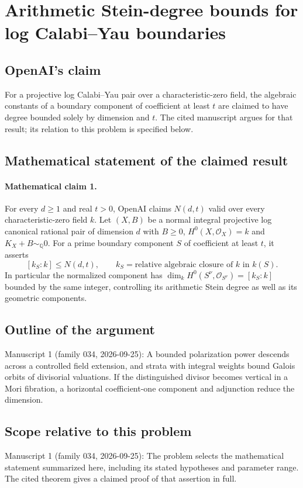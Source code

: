 \documentclass[11pt]{article}
\begin{document}
\section*{Arithmetic Stein-degree bounds for log Calabi–Yau boundaries}

\subsection{OpenAI's claim}
For a projective log Calabi--Yau pair over a characteristic-zero field, the algebraic constants of a boundary component of coefficient at least $t$ are claimed to have degree bounded solely by dimension and $t$. The cited manuscript argues for that result; its relation to this problem is specified below.

\subsection{Mathematical statement of the claimed result}
\paragraph{Mathematical claim 1.} For every $d\ge1$ and real $t>0$, OpenAI claims $N(d,t)$ valid over every characteristic-zero field $k$. Let $(X,B)$ be a normal integral projective log canonical rational pair of dimension $d$ with $B\ge0$, $H^0(X,\mathcal O_X)=k$ and $K_X+B\sim_{\mathbb Q}0$. For a prime boundary component $S$ of coefficient at least $t$, it asserts
\[
[k_S:k]\le N(d,t),\qquad k_S=\text{relative algebraic closure of }k\text{ in }k(S).
\]
In particular the normalized component has $\dim_kH^0(S^\nu,\mathcal O_{S^\nu})=[k_S:k]$ bounded by the same integer, controlling its arithmetic Stein degree as well as its geometric components.

\subsection{Outline of the argument}
Manuscript 1 (family 034, 2026-09-25): A bounded polarization power descends across a controlled field extension, and strata with integral weights bound Galois orbits of divisorial valuations. If the distinguished divisor becomes vertical in a Mori fibration, a horizontal coefficient-one component and adjunction reduce the dimension.

\subsection{Scope relative to this problem}
Manuscript 1 (family 034, 2026-09-25): The problem selects the mathematical statement summarized here, including its stated hypotheses and parameter range. The cited theorem gives a claimed proof of that assertion in full.
\end{document}
